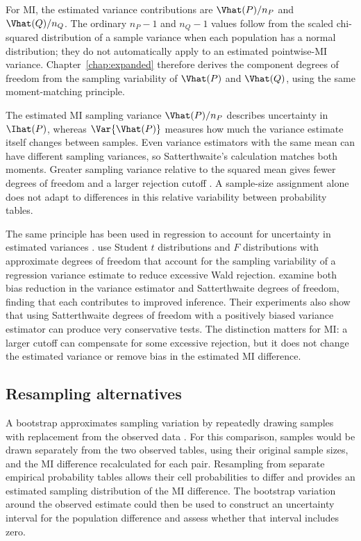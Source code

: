 For MI, the estimated variance contributions are \(\Vhat(P)/n_P\) and
\(\Vhat(Q)/n_Q\). The ordinary \(n_P-1\) and \(n_Q-1\) values follow
from the scaled chi-squared distribution of a sample variance when each
population has a normal distribution; they do not automatically apply to an
estimated pointwise-MI variance.
Chapter~\ref{chap:expanded} therefore derives the component degrees of
freedom from the sampling variability of \(\Vhat(P)\) and \(\Vhat(Q)\),
using the same moment-matching principle.

The estimated MI sampling variance \(\Vhat(P)/n_P\) describes uncertainty
in \(\Ihat(P)\), whereas \(\Var\{\Vhat(P)\}\) measures how much the
variance estimate itself changes between samples. Even variance estimators
with the same mean can have different sampling variances, so Satterthwaite's
calculation matches both moments. Greater sampling variance relative to the
squared mean gives fewer degrees of freedom and a larger rejection cutoff
\citep{satterthwaite1946}. A sample-size assignment alone does not adapt
to differences in this relative variability between probability tables.

The same principle has been used in regression to account for
uncertainty in estimated variances
\citep{panwall2002,bell2002,kauermann2001,fay2001,imbens2016}.
\citet{panwall2002} use Student \(t\) distributions and \(F\) distributions with
approximate degrees of freedom that account for the sampling variability
of a regression variance estimate to reduce excessive Wald rejection.
\citet{bell2002} examine both
bias reduction in the variance estimator and Satterthwaite degrees of
freedom, finding that each contributes to improved inference. Their
experiments also show that using Satterthwaite degrees of freedom with a
positively biased variance estimator can produce very conservative tests.
The distinction matters for MI: a larger cutoff can compensate for some
excessive rejection, but it does not change the estimated variance or
remove bias in the estimated MI difference.

\subsection{Resampling alternatives}

A bootstrap approximates sampling variation by repeatedly drawing samples
with replacement from the observed data \citep{efron1979}. For this
comparison, samples would be drawn separately from the two observed tables,
using their original sample sizes, and the MI difference recalculated for
each pair. Resampling from separate empirical probability tables allows
their cell probabilities to differ and provides an estimated sampling
distribution of the MI difference. The bootstrap
variation around the observed estimate could then be used to construct
an uncertainty interval for the population difference and assess whether
that interval includes zero.

